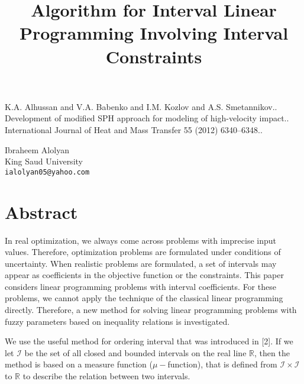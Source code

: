 \documentclass[article,A4,11pt]{llncs}%
\begin{document}

\begin{thebibliography}{10}
{\sc K.A. Alhussan and V.A. Babenko and I.M. Kozlov and A.S. Smetannikov.}. {Development of modified SPH approach for modeling of high-velocity impact.}. International Journal of Heat and Mass Transfer 55 (2012) 6340–6348..
\end{thebibliography}

\title{Algorithm for Interval Linear  Programming Involving Interval Constraints}
 \author{} \institute{}
\maketitle
\begin{center}
{\large Ibraheem Alolyan}\\
King Saud University\\
{\tt ialolyan05@yahoo.com}
\end{center}

\section*{Abstract}
In real optimization, we always come across problems with imprecise 
input values. Therefore, optimization problems are formulated 
under conditions of uncertainty. When realistic problems are formulated, 
a set of intervals may appear as coefficients in the objective 
function or the constraints. 
This paper considers linear programming problems with interval 
coefficients. For these problems, we cannot apply the technique of the 
classical linear programming directly. Therefore, a new method for 
solving linear programming problems with fuzzy parameters based on 
inequality relations  is investigated. 


        We use the useful method for ordering interval that was introduced in [2].    If we let   $\mathscr{I}$ be the set of all closed and bounded intervals on the real line $\mathbb R$, then the method is based on a measure function ($\mu-$function), that is defined from $\mathscr{I} \times \mathscr{I}$ to $\mathbb R$ to describe the relation between two intervals. 
\end{document}
